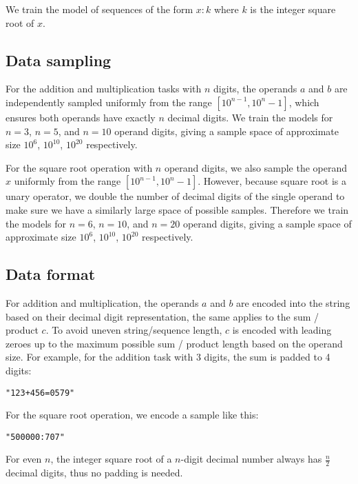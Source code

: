 We train the model of sequences of the form $x: k$ where $k$ is the integer square root of $x$.

\subsection{Data sampling}
\label{data_sampling}

For the addition and multiplication tasks with $n$ digits, the operands $a$ and $b$ are independently sampled uniformly from the range $[{10}^{n-1}, 10^n - 1]$, which ensures both operands have exactly $n$ decimal digits. We train the models for $n=3$, $n=5$,  and $n=10$ operand digits, giving a sample space of approximate size $10^6$, $10^{10}$, $10^{20}$ respectively.

For the square root operation with $n$ operand digits, we also sample the operand $x$ uniformly from the range $[{10}^{n-1}, 10^n - 1]$. However, because square root is a unary operator, we double the number of decimal digits of the single operand to make sure we have a similarly large space of possible samples. Therefore we train the models for $n=6$, $n=10$,  and $n=20$ operand digits, giving a sample space of approximate size $10^6$, $10^{10}$, $10^{20}$ respectively.

\subsection{Data format}

For addition and multiplication, the operands $a$ and $b$ are encoded into the string based on their decimal digit representation, the same applies to the sum / product $c$. 
To avoid uneven string/sequence length, $c$ is encoded with leading zeroes up to the maximum possible sum / product length based on the operand size. For example, for the addition task with 3 digits, the sum is padded to 4 digits:

\begin{lstlisting}
"123+456=0579"
\end{lstlisting}

For the square root operation, we encode a sample like this:

\begin{lstlisting}
"500000:707"
\end{lstlisting}

For even $n$, the integer square root of a $n$-digit decimal number always has $\frac{n}{2}$ decimal digits, thus no padding is needed.

